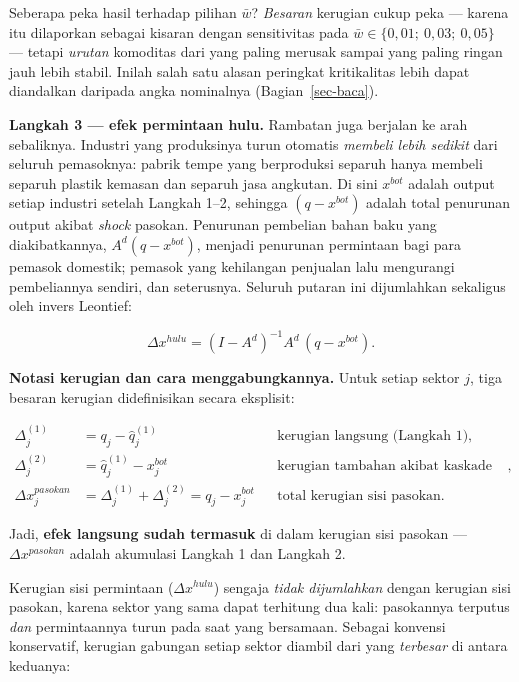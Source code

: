 \documentclass[
  manuscript=article,
  layout=publish,
  year=2026,
  volume=1,
]{den}
\begin{document}
Seberapa peka hasil terhadap pilihan \(\bar w\)? \emph{Besaran} kerugian
cukup peka --- karena itu dilaporkan sebagai kisaran dengan sensitivitas
pada \(\bar w \in
\{0{,}01;\ 0{,}03;\ 0{,}05\}\) --- tetapi \emph{urutan} komoditas dari
yang paling merusak sampai yang paling ringan jauh lebih stabil. Inilah
salah satu alasan peringkat kritikalitas lebih dapat diandalkan daripada
angka nominalnya (Bagian~\ref{sec-baca}).

\textbf{Langkah 3 --- efek permintaan hulu.} Rambatan juga berjalan ke
arah sebaliknya. Industri yang produksinya turun otomatis \emph{membeli
lebih sedikit} dari seluruh pemasoknya: pabrik tempe yang berproduksi
separuh hanya membeli separuh plastik kemasan dan separuh jasa angkutan.
Di sini \(x^{bot}\) adalah output setiap industri setelah Langkah 1--2,
sehingga \((q - x^{bot})\) adalah total penurunan output akibat
\emph{shock} pasokan. Penurunan pembelian bahan baku yang
diakibatkannya, \(A^d (q -
x^{bot})\), menjadi penurunan permintaan bagi para pemasok domestik;
pemasok yang kehilangan penjualan lalu mengurangi pembeliannya sendiri,
dan seterusnya. Seluruh putaran ini dijumlahkan sekaligus oleh invers
Leontief:

\[
\Delta x^{hulu} = (I - A^d)^{-1} A^d \, (q - x^{bot}).
\]

\textbf{Notasi kerugian dan cara menggabungkannya.} Untuk setiap sektor
\(j\), tiga besaran kerugian didefinisikan secara eksplisit:

\[
\begin{aligned}
\Delta^{(1)}_j &= q_j - \hat q^{(1)}_j
  && \text{kerugian langsung (Langkah 1)},\\
\Delta^{(2)}_j &= \hat q^{(1)}_j - x^{bot}_j
  && \text{kerugian tambahan akibat kaskade (Langkah 2)},\\
\Delta x^{pasokan}_j &= \Delta^{(1)}_j + \Delta^{(2)}_j = q_j - x^{bot}_j
  && \text{total kerugian sisi pasokan}.
\end{aligned}
\]

Jadi, \textbf{efek langsung sudah termasuk} di dalam kerugian sisi
pasokan --- \(\Delta
x^{pasokan}\) adalah akumulasi Langkah 1 dan Langkah 2.

Kerugian sisi permintaan (\(\Delta x^{hulu}\)) sengaja \emph{tidak
dijumlahkan} dengan kerugian sisi pasokan, karena sektor yang sama dapat
terhitung dua kali: pasokannya terputus \emph{dan} permintaannya turun
pada saat yang bersamaan. Sebagai konvensi konservatif, kerugian
gabungan setiap sektor diambil dari yang \emph{terbesar} di antara
keduanya:
\end{document}
